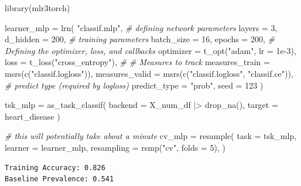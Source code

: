 \documentclass[
  letterpaper,
]{krantz}
\newenvironment{Shaded}{}{}
\newcommand{\AttributeTok}[1]{\textcolor[rgb]{0.49,0.56,0.16}{#1}}
\newcommand{\CommentTok}[1]{\textcolor[rgb]{0.38,0.63,0.69}{\textit{#1}}}
\newcommand{\DecValTok}[1]{\textcolor[rgb]{0.25,0.63,0.44}{#1}}
\newcommand{\FloatTok}[1]{\textcolor[rgb]{0.25,0.63,0.44}{#1}}
\newcommand{\FunctionTok}[1]{\textcolor[rgb]{0.02,0.16,0.49}{#1}}
\newcommand{\NormalTok}[1]{#1}
\newcommand{\OtherTok}[1]{\textcolor[rgb]{0.00,0.44,0.13}{#1}}
\newcommand{\SpecialCharTok}[1]{\textcolor[rgb]{0.25,0.44,0.63}{#1}}
\newcommand{\StringTok}[1]{\textcolor[rgb]{0.25,0.44,0.63}{#1}}
\begin{document}
\begin{Shaded}
\begin{Highlighting}[]
\FunctionTok{library}\NormalTok{(mlr3torch)}

\NormalTok{learner\_mlp }\OtherTok{=} \FunctionTok{lrn}\NormalTok{(}
    \StringTok{"classif.mlp"}\NormalTok{,}
    \CommentTok{\# defining network parameters}
    \AttributeTok{layers =} \DecValTok{3}\NormalTok{,}
    \AttributeTok{d\_hidden =} \DecValTok{200}\NormalTok{,}
    \CommentTok{\# training parameters}
    \AttributeTok{batch\_size =} \DecValTok{16}\NormalTok{,}
    \AttributeTok{epochs =} \DecValTok{200}\NormalTok{,}
    \CommentTok{\# Defining the optimizer, loss, and callbacks}
    \AttributeTok{optimizer =} \FunctionTok{t\_opt}\NormalTok{(}\StringTok{"adam"}\NormalTok{, }\AttributeTok{lr =} \FloatTok{1e{-}3}\NormalTok{),}
    \AttributeTok{loss =} \FunctionTok{t\_loss}\NormalTok{(}\StringTok{"cross\_entropy"}\NormalTok{),}
    \CommentTok{\# \# Measures to track}
    \AttributeTok{measures\_train =} \FunctionTok{msrs}\NormalTok{(}\FunctionTok{c}\NormalTok{(}\StringTok{"classif.logloss"}\NormalTok{)),}
    \AttributeTok{measures\_valid =} \FunctionTok{msrs}\NormalTok{(}\FunctionTok{c}\NormalTok{(}\StringTok{"classif.logloss"}\NormalTok{, }\StringTok{"classif.ce"}\NormalTok{)),}
    \CommentTok{\# predict type (required by logloss)}
    \AttributeTok{predict\_type =} \StringTok{"prob"}\NormalTok{,}
    \AttributeTok{seed =} \DecValTok{123}
\NormalTok{)}

\NormalTok{tsk\_mlp }\OtherTok{=} \FunctionTok{as\_task\_classif}\NormalTok{(}
    \AttributeTok{backend =}\NormalTok{ X\_num\_df }\SpecialCharTok{|\textgreater{}} \FunctionTok{drop\_na}\NormalTok{(),}
    \AttributeTok{target =} \StringTok{\textquotesingle{}heart\_disease\textquotesingle{}}
\NormalTok{)}

\CommentTok{\# this will potentially take about a minute}
\NormalTok{cv\_mlp }\OtherTok{=} \FunctionTok{resample}\NormalTok{(}
    \AttributeTok{task       =}\NormalTok{ tsk\_mlp,}
    \AttributeTok{learner    =}\NormalTok{ learner\_mlp,}
    \AttributeTok{resampling =} \FunctionTok{rsmp}\NormalTok{(}\StringTok{"cv"}\NormalTok{, }\AttributeTok{folds =} \DecValTok{5}\NormalTok{),}
\NormalTok{)}
\end{Highlighting}
\end{Shaded}

\begin{verbatim}
Training Accuracy: 0.826
Baseline Prevalence: 0.541
\end{verbatim}
\end{document}
